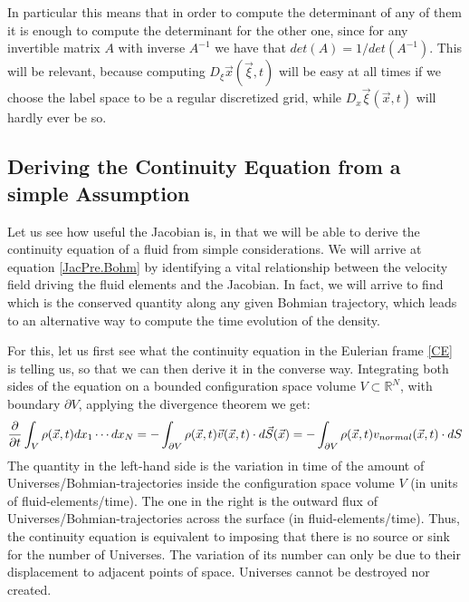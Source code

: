 \documentclass[11pt, a4paper]{article} %
\newcommand{\R}{\mathbb{R}} %
\begin{document}
In particular this means that in order to compute the determinant of any of them it is enough to compute the determinant for the other one, since for any invertible matrix $A$ with inverse $A^{-1}$ we have that $det(A)=1/det(A^{-1})$. This will be relevant, because computing $D_\xi \vec{x}(\vec{\xi},t)$ will be easy at all times if we choose the label space to be a regular discretized grid, while $D_x \vec{\xi}(\vec{x},t)$ will hardly ever be so.

\subsection*{Deriving the Continuity Equation from a simple Assumption \vspace{-0.2cm} }
Let us see how useful the Jacobian is, in that we will be able to derive the continuity equation of a fluid from simple considerations. We will arrive at equation \eqref{JacPre.Bohm} by identifying a vital relationship between the velocity field driving the fluid elements and the Jacobian. In fact, we will arrive to find which is the conserved quantity along any given Bohmian trajectory, which leads to an alternative way to compute the time evolution of the density.

For this, let us first see what the continuity equation in the Eulerian frame \eqref{CE} is telling us, so that we can then derive it in the converse way. Integrating both sides of the equation on a bounded configuration space volume $V\subset\R^N$, with boundary $\partial V$, applying the divergence theorem we get:
\begin{equation}
\pdv{}{t} \int_{V} \rho(\vec{x},t) dx_1\cdots dx_N=-\int_{\partial V} \rho(\vec{x},t)\vec{v}(\vec{x},t)\cdot d\vec{S}(\vec{x})=-\int_{\partial V} \rho(\vec{x},t)v_{normal}(\vec{x},t)\cdot dS
\end{equation}
The quantity in the left-hand side is the variation in time of the amount of Universes/Bohmian-trajectories inside the configuration space volume $V$ (in units of fluid-elements/time). The one in the right is the outward flux of Universes/Bohmian-trajectories across the surface (in fluid-elements/time). Thus, the continuity equation is equivalent to imposing that there is no source or sink for the number of Universes. The variation of its number can only be due to their displacement to adjacent points of space. Universes cannot be destroyed nor created.
\end{document}
